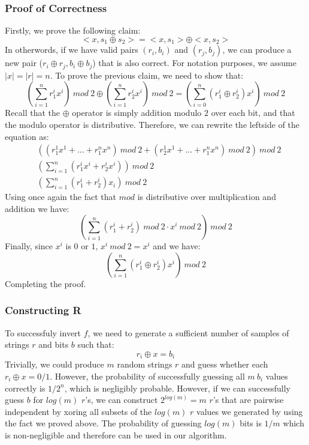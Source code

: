 \documentclass[11pt]{article}
\begin{document}
\subsubsection{Proof of Correctness}
Firstly, we prove the following claim:
$$<x,s_1\oplus s_2> = <x,s_1> \oplus <x,s_2>$$
In otherwords, if we have valid pairs $(r_i,b_i)$ and $(r_j,b_j)$, we can produce a new pair ($r_i \oplus r_j, b_i \oplus b_j$) that is also correct. For notation purposes, we assume $|x| = |r| = n$. To prove the previous claim, we need to show that:
$$(\sum_{i=1}^{n}r_1^ix^i)\ mod\ 2 \oplus (\sum_{i=1}^nr_2^ix^i)\ mod\ 2 = (\sum_{i=0}^{n}(r_1^i \oplus r_2^i)x^i)\ mod\ 2$$
Recall that the $\oplus$ operator is simply addition modulo $2$ over each bit, and that the modulo operator is distributive. Therefore, we can rewrite the leftside of the equation as:
\begin{align*}
&((r_1^1x^1 + ... + r_1^nx^n)\ mod\ 2 + (r_2^1x^1+...+r_1^nx^n)\ mod\ 2)\ mod\ 2\\
&(\sum_{i=1}^n (r_1^ix^i + r_2^ix^i))\ mod\ 2\\
&(\sum_{i=1}^n (r_1^i + r_2^i)x_i)\ mod\ 2
\end{align*}
Using once again the fact that $mod$ is distributive over multiplication and addition we have:
$$(\sum_{i=1}^n (r_1^i + r_2^i)\ mod\ 2\cdot x^i\ mod\ 2)\ mod\ 2$$
Finally, since $x^i$ is $0$ or $1$, $x^i\ mod\ 2 = x^i$ and we have:
$$(\sum_{i=1}^n (r_1^i \oplus r_2^i) x^i)\ mod\ 2$$
Completing the proof.
\vspace{1em}
\subsubsection{Constructing R}
To successfuly invert $f$, we need to generate a sufficient number of samples of strings $r$ and bits $b$ such that:
$$r_i \oplus x = b_i$$
Trivially, we could produce $m$ random strings $r$ and guess whether each $r_i \oplus x = 0/1$. However, the probability of successfully guessing all $m \ b_i$ values correctly is $1/2^n$, which is negligibly probable. However, if we can successfully guess $b$ for $log(m)$ $r$'s, we can construct $2^{log(m)}=m$ $r$'s that are pairwise independent by xoring all subsets of the $log(m)$ $r$ values we generated by using the fact we proved above. The probability of guessing $log(m)$ bits is $1/m$ which is non-negligible and therefore can be used in our algorithm.
\end{document}

